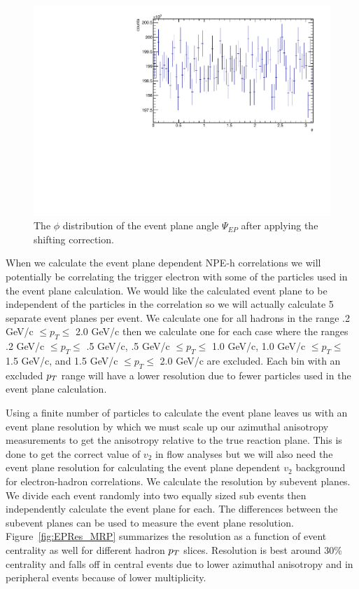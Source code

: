 \begin{figure}[htbp]
\begin{center}
\includegraphics[scale=.8]{Plots/Correlations/EPPhi_corrected.pdf}
\end{center}
\caption[Corrected Event Plane Distribution]{The $\phi$ distribution of the event plane angle $\Psi_{EP}$ after applying the shifting correction.}
\label{fig:EPPhi_corrected}
\end{figure}

When we calculate the event plane dependent NPE-h correlations we will potentially be correlating the trigger electron with some of the particles used in the event plane calculation. We would like the calculated event plane to be independent of the particles in the correlation so we will actually calculate 5 separate event planes per event. We calculate one for all hadrons in the range .2 GeV/c $\leq p_{T} \leq $ 2.0 GeV/c then we calculate one for each case where the ranges .2 GeV/c $\leq p_{T} \leq$ .5 GeV/c, .5 GeV/c $\leq p_{T} \leq$ 1.0 GeV/c, 1.0 GeV/c $\leq p_{T} \leq$ 1.5 GeV/c, and 1.5 GeV/c $\leq p_{T} \leq$ 2.0 GeV/c are excluded. Each bin with an excluded $p_{T}$ range will have a lower resolution due to fewer particles used in the event plane calculation.

Using a finite number of particles to calculate the event plane leaves us with an event plane resolution by which we must scale up our azimuthal anisotropy measurements to get the anisotropy relative to the true reaction plane. This is done to get the correct value of $v_2$ in flow analyses but we will also need the event plane resolution for calculating the event plane dependent $v_2$ background for electron-hadron correlations. We calculate the resolution by subevent planes. We divide each event randomly into two equally sized sub events then independently calculate the event plane for each. The differences between the subevent planes can be used to measure the event plane resolution. Figure~\ref{fig:EPRes_MRP} summarizes the resolution as a function of event centrality as well for different hadron $p_{T}$ slices. Resolution is best around 30\% centrality and falls off in central events due to lower azimuthal anisotropy and in peripheral events because of lower multiplicity.

